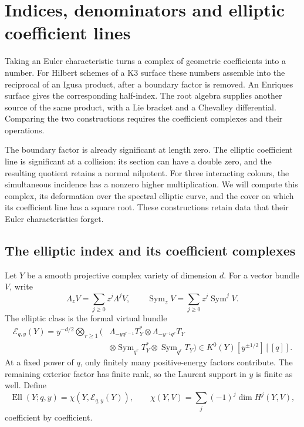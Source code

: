 \chapter{Indices, denominators and elliptic coefficient lines}
\label{cyidx:chapter}

Taking an Euler characteristic turns a complex of geometric
coefficients into a number. For Hilbert schemes of a K3 surface
these numbers assemble into the reciprocal of an Igusa product,
after a boundary factor is removed. An Enriques surface gives
the corresponding half-index. The root algebra supplies another
source of the same product, with a Lie bracket and a Chevalley
differential. Comparing the two constructions requires the
coefficient complexes and their operations.

The boundary factor is already significant at length zero.
The elliptic coefficient line is significant at a collision:
its section can have a double zero, and the resulting quotient
retains a normal nilpotent. For three interacting colours,
the simultaneous incidence has a nonzero higher multiplication.
We will compute this complex, its deformation over the spectral
elliptic curve, and the cover on which its coefficient line
has a square root. These constructions retain data that their
Euler characteristics forget.

\section{The elliptic index and its coefficient complexes}
\label{cyidx:sec:index}

Let \(Y\) be a smooth projective complex variety of dimension \(d\).
For a vector bundle \(V\), write
\[
 \Lambda_zV=\sum_{j\geq0}z^j\Lambda^jV,\qquad
 \operatorname{Sym}_zV=\sum_{j\geq0}z^j\operatorname{Sym}^jV.
\]
The elliptic class is the formal virtual bundle
\begin{equation}\label{cyidx:eq:elliptic-class}
\begin{split}
 \mathcal E_{q,y}(Y)=y^{-d/2}\bigotimes_{r\geq1}
 \bigl(&\Lambda_{-yq^{r-1}}T_Y^*
       \otimes\Lambda_{-y^{-1}q^r}T_Y\\
       &\otimes\operatorname{Sym}_{q^r}T_Y^*
       \otimes\operatorname{Sym}_{q^r}T_Y\bigr)
 \in K^0(Y)[y^{\pm1/2}][[q]].
\end{split}
\end{equation}
At a fixed power of \(q\), only finitely many positive-energy
factors contribute. The remaining exterior factor has finite
rank, so the Laurent support in \(y\) is finite as well.
Define
\[
 \operatorname{Ell}(Y;q,y)=
 \chi(Y,\mathcal E_{q,y}(Y)),\qquad
 \chi(Y,V)=\sum_j(-1)^j\dim H^j(Y,V),
\]
coefficient by coefficient.

